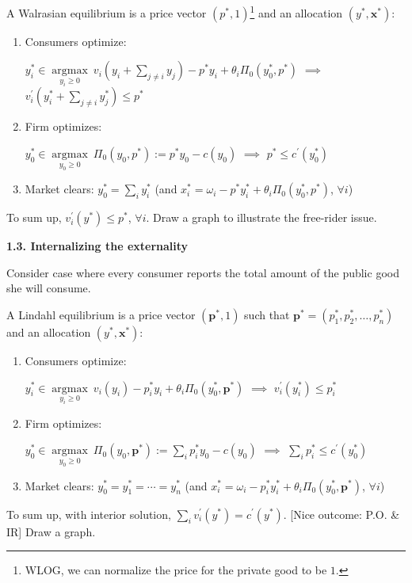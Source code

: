 \documentclass[11pt,leqno]{article}
\begin{document}
A Walrasian equilibrium is a price vector $(p^{*},1)$\footnote{WLOG, we can normalize the price for the private good to be $1$.} and an allocation $(y^{*},\textbf{x}^{*})$:
\begin{enumerate}
    \item Consumers optimize: 
    
    $y_i^{*} \in \underset{y_i \geq 0}{\operatorname{argmax}} ~v_i\left(y_i+\sum_{j \neq i} y_j\right)-p^* y_i+\theta_{i} \Pi_{0}(y_{0}^{*},p^{*})$ $\implies$ $v_{i}^{\prime}\left(y^* _i+\sum_{j \neq i} y^* _j\right)\leq p^{*}$
    \item Firm optimizes: 
    
    $y_0^{*} \in \underset{y_0 \geq 0}{\operatorname{argmax}} ~\Pi_{0}(y_{0},p^{*}):=p^{*} y_0 -c(y_0)$ $\implies$ $p^{*}\leq c^{\prime}(y_{0}^{*})$
    \item Market clears: $y_0^{*}=\sum_{i} y_i^{*}$ (and $x_{i}^{*}=\omega_{i}-p^* y^{*}_i+\theta_{i} \Pi_{0}(y_{0}^{*},p^{*})$, $\forall i$)
\end{enumerate}

To sum up, $v_{i}^{\prime}\left(y^*\right)\leq p^{*}$, $\forall i$. Draw a graph to illustrate the free-rider issue.

\textbf{1.3. Internalizing the externality}

Consider case where every consumer reports the total amount of the public good she will consume.

A Lindahl equilibrium is a price vector $(\textbf{p}^{*},1)$ such that $\textbf{p}^{*}=(p^* _1,p^* _2,\ldots,p^* _n)$ and an allocation $(y^{*},\textbf{x}^{*})$:

\begin{enumerate}
    \item Consumers optimize: 
    
    $y_i^{*} \in \underset{y_i \geq 0}{\operatorname{argmax}} ~v_i\left(y_i\right)-p_{i}^* y_i+\theta_{i} \Pi_{0}(y_{0}^{*},\textbf{p}^{*})$ $\implies$ $v_{i}^{\prime}\left(y^* _i\right) \leq p_i ^{*}$
    \item Firm optimizes: 
    
    $y_0^{*} \in \underset{y_0 \geq 0}{\operatorname{argmax}} ~\Pi_{0}(y_{0},\textbf{p}^{*}):=\sum_{i} p_{i}^{*} y_0 -c(y_0)$ $\implies$ $\sum_{i} p_{i}^{*} \leq c^{\prime}(y_{0}^{*})$
    \item Market clears: $y_0 ^{*}=y_1 ^{*}=\cdots=y_n ^{*}$ (and $x_{i}^{*}=\omega_{i}-p_{i}^* y^{*}_i+\theta_{i} \Pi_{0}(y_{0}^{*},\textbf{p}^{*})$, $\forall i$)
\end{enumerate}
To sum up, with interior solution, $\sum_{i} v_{i}^{\prime}\left(y^*\right)= c^{\prime}(y^{*})$. [Nice outcome: P.O. \& IR] Draw a graph.
\end{document}
